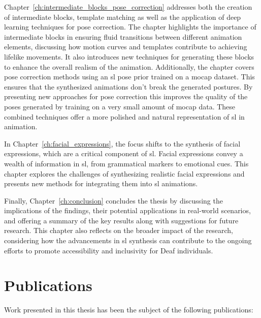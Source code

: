 \documentclass[../../main.tex]{subfiles}
\begin{document}
Chapter~\ref{ch:intermediate_blocks_pose_correction} addresses both the creation of intermediate blocks, template matching as well as the application of deep learning techniques for pose correction. The chapter highlights the importance of intermediate blocks in ensuring fluid transitions between different animation elements, discussing how motion curves and templates contribute to achieving lifelike movements. It also introduces new techniques for generating these blocks to enhance the overall realism of the animation. Additionally, the chapter covers pose correction methods using an \gls{sl} pose prior trained on a \gls{mocap} dataset. This ensures that the synthesized animations don't break the generated postures. By presenting new approaches for pose correction this improves the quality of the poses generated by training on a very small amount of \gls{mocap} data. These combined techniques offer a more polished and natural representation of \gls{sl} in animation.

In Chapter~\ref{ch:facial_expressions}, the focus shifts to the synthesis of facial expressions, which are a critical component of \gls{sl}. Facial expressions convey a wealth of information in \gls{sl}, from grammatical markers to emotional cues. This chapter explores the challenges of synthesizing realistic facial expressions and presents new methods for integrating them into \gls{sl} animations.

Finally, Chapter~\ref{ch:conclusion} concludes the thesis by discussing the implications of the findings, their potential applications in real-world scenarios, and offering a summary of the key results along with suggestions for future research. This chapter also reflects on the broader impact of the research, considering how the advancements in \gls{sl} synthesis can contribute to the ongoing efforts to promote accessibility and inclusivity for Deaf individuals.

\section{Publications}

Work presented in this thesis has been the subject of the following publications:
\end{document}
